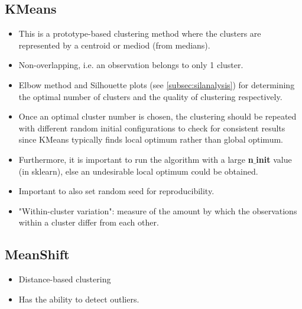\documentclass[a4paper, 12pt]{report}
\begin{document}
\subsection{KMeans}
\label{kmeans}
\begin{itemize}
\item This is a prototype-based clustering method where the clusters are represented by a centroid or mediod (from medians).
\item Non-overlapping, i.e. an observation belongs to only 1 cluster.
\item Elbow method and Silhouette plots (see  \autoref{subsec:silanalysis}) for determining the optimal number of clusters and the quality of clustering respectively.
\item Once an optimal cluster number is chosen, the clustering should be repeated with different random initial configurations to check for consistent results since KMeans typically finds local optimum rather than global optimum.
\item Furthermore, it is important to run the algorithm with a large \textbf{n$\_$init} value (in sklearn), else an undesirable local optimum could be obtained.
\item Important to also set random seed for reproducibility.
\item "Within-cluster variation": measure of the amount by which the observations within a cluster differ from each other.
\end{itemize}

\subsection{MeanShift}
\begin{itemize}
\item Distance-based clustering
\item Has the ability to detect outliers.
\end{itemize}
\end{document}
